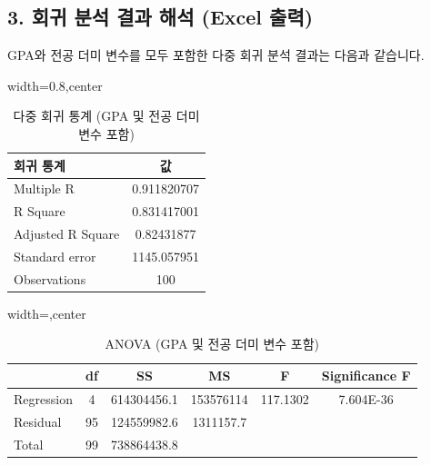 \documentclass[11pt,a4paper]{book}
\theoremstyle{definition}
\begin{document}
\subsection{3. 회귀 분석 결과 해석 (Excel 출력)}
GPA와 전공 더미 변수를 모두 포함한 다중 회귀 분석 결과는 다음과 같습니다.

\begin{table}[htbp]
\centering
\caption{다중 회귀 통계 (GPA 및 전공 더미 변수 포함)}
\label{tab:multi_reg_gpa_major}
\begin{adjustbox}{width=0.8\textwidth,center}
\begin{tabular}{lc}
\toprule
\textbf{회귀 통계} & \textbf{값} \\
\midrule
Multiple R & 0.911820707 \\
R Square & 0.831417001 \\
Adjusted R Square & 0.82431877 \\
Standard error & 1145.057951 \\
Observations & 100 \\
\bottomrule
\end{tabular}
\end{adjustbox}
\end{table}

\begin{table}[htbp]
\centering
\caption{ANOVA (GPA 및 전공 더미 변수 포함)}
\label{tab:anova_gpa_major}
\begin{adjustbox}{width=\textwidth,center}
\begin{tabular}{lccccc}
\toprule
\textbf{} & \textbf{df} & \textbf{SS} & \textbf{MS} & \textbf{F} & \textbf{Significance F} \\
\midrule
Regression & 4 & 614304456.1 & 153576114 & 117.1302 & 7.604E-36 \\
Residual & 95 & 124559982.6 & 1311157.7 & & \\
Total & 99 & 738864438.8 & & & \\
\bottomrule
\end{tabular}
\end{adjustbox}
\end{table}
\end{document}
